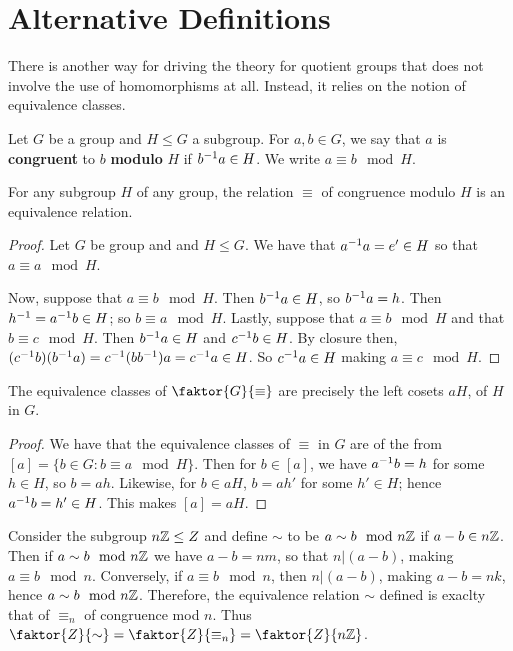 \section{Alternative Definitions}
\label{section_3.2}

There is another way for driving the theory for quotient groups that does not
involve the use of homomorphisms at all. Instead, it relies on the notion of
equivalence classes.

\begin{definition}
  Let $G$ be a group and  $H \leq G$ a subgroup. For $a,b \in G$, we say that
  $a$ is  \textbf{congruent} to $b$ \textbf{modulo} $H$ if $b^{-1}a \in H$.
  We write $a \equiv b \mod{H}$.
\end{definition}

\begin{lemma}\label{lemma_3.2.1}
  For any subgroup $H$ of any group, the relation $\equiv$ of congruence
  modulo $H$ is an equivalence relation.
\end{lemma}
\begin{proof}
  Let $G$ be group and and  $H \leq G$. We have that  $a^{-1}a = e' \in H$ so
  that $a \equiv a \mod{H}$.

  Now, suppose that $a \equiv b \mod{H}$. Then $b^{-1}a \in H$, so
  $b^{-1}a=h$. Then $h^{-1}=a^{-1}b \in H$; so $b \equiv a \mod{H}$.
  Lastly, suppose that $a \equiv b \mod{H}$ and that $b \equiv c \mod{H}$.
  Then  $b^{-1}a \in H$ and $c^{-1}b \in H$. By closure then,
  $(c^{-1}b)(b^{-1}a)=c^{-1}(bb^{-1})a=c^{-1}a \in H$. So $c^{-1}a \in
  H$ making $a \equiv c \mod{H}$.
\end{proof}
\begin{corollary}
  The equivalence classes of $\faktor{G}{\equiv}$ are precisely the left
  cosets $aH$, of $H$ in  $G$.
\end{corollary}
\begin{proof}
  We have that the equivalence classes of $\equiv$ in  $G$ are of the from
  $[a]=\{b \in G : b \equiv a \mod{H}\}$. Then for $b \in [a]$, we have
  $a^{-1}b=h$ for some $h \in H$, so  $b=ah$. Likewise, for  $b \in aH$,
  $b=ah'$ for some $h' \in H$; hence  $a^{-1}b =h' \in H$. This makes
  $[a]=aH$.
\end{proof}

\begin{example}\label{example_3.3}
  Consider the subgroup $n\mathbb{Z} \leq Z$ and define  $\sim$ to be $a \sim b
  \mod{n\mathbb{Z}}$ if $a-b \in n\mathbb{Z}$. Then if  $a \sim b \mod{n\mathbb{Z}}$ we have
  $a-b=nm$, so that  $n|(a-b)$, making $a \equiv b \mod{n}$. Conversely, if $a
  \equiv b \mod{n}$, then $n|(a-b)$, making $a-b=nk$, hence  $a \sim b
  \mod{n\mathbb{Z}}$. Therefore, the equivalence relation $\sim$ defined is exaclty
  that of $\equiv_n$ of congruence mod $n$. Thus
  $\faktor{Z}{\sim}=\faktor{Z}{\equiv_n}=\faktor{Z}{n\Z}$.
\end{example}

